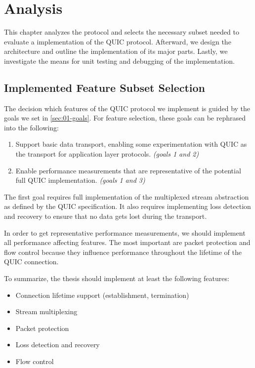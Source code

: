 \chapter{Analysis}\label{chap:03-analysis}

This chapter analyzes the protocol and selects the necessary subset needed to evaluate a \dotnet{}
implementation of the QUIC protocol. Afterward, we design the architecture and outline the
implementation of its major parts. Lastly, we investigate the means for unit testing and debugging
of the implementation.

\section{Implemented Feature Subset Selection}\label{sec:03-feature-selection}

The decision which features of the QUIC protocol we implement is guided by the goals we set in
\autoref{sec:01-goals}. For feature selection, these goals can be rephrased into the following:

\begin{enumerate}

  \item Support basic data transport, enabling some experimentation with QUIC as the transport for
application layer protocols. \textit{(goals 1 and 2)}

  \item Enable performance measurements that are representative of the potential full QUIC
implementation. \textit{(goals 1 and 3)}

\end{enumerate}

The first goal requires full implementation of the multiplexed stream abstraction as defined by the
QUIC specification. It also requires implementing loss detection and recovery to ensure that no data
gets lost during the transport.

In order to get representative performance measurements, we should implement all performance
affecting features. The most important are packet protection and flow control because they influence
performance throughout the lifetime of the QUIC connection.

To summarize, the thesis should implement at least the following features:

\begin{itemize}

    \item Connection lifetime support (establishment, termination)

    \item Stream multiplexing

    \item Packet protection

    \item Loss detection and recovery

    \item Flow control

\end{itemize}

